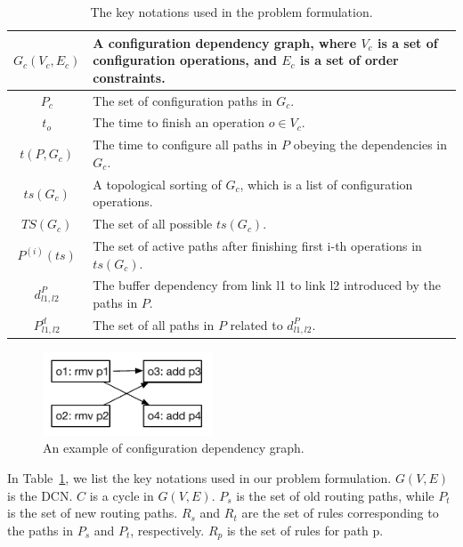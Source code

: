 \begin{table}
\begin{tabularx}{0.48\textwidth}{ |c||X| }
	$G_c(V_c,E_c)$ & A configuration dependency graph, where $V_c$ is a set of configuration operations, and $E_c$ is a set of order constraints.\\
	\hline
	$P_c$ & The set of configuration paths in $G_c$.\\
	\hline
	$t_o$ & The time to finish an operation $ o \in V_c$.\\
	\hline
	$t(P, G_c)$&The time to configure all paths in $P$ obeying the dependencies in $G_c$.\\
	\hline
	$ts(G_c)$ & A topological sorting of $G_c$, which is a list of configuration operations. \\ 
	\hline
	$TS(G_c)$ & The set of all possible $ts(G_c)$. \\
	\hline
	$P^{(i)}(ts)$& The set of active paths after finishing first i-th operations in $ts(G_c)$.\\
	\hline
	$d_{l1,l2}^P$ & The buffer dependency from link l1 to link l2 introduced by the paths in $P$.\\
	\hline
	$P^d_{l1,l2}$ & The set of all paths in $P$ related to  $d_{l1,l2}^P$.\\
	\hline
\end{tabularx}
\caption{The key notations used in the problem formulation.}\label{table:formulation}
\end{table}


\begin{figure}[t]
	\centering
		\includegraphics[width=0.45\textwidth] {figs/formulation_example}
	\caption{An example of configuration dependency graph.}\label{fig:cdgraph}
	
\end{figure}

In Table~\ref{table:formulation}, we list the key notations used in our problem formulation. $G(V,E)$ is the DCN. $C$ is a cycle in $G(V,E)$.  $P_s$ is the set of old routing paths, while $P_t$ is the set of new routing paths. $R_s$ and $R_t$ are the set of rules corresponding to the paths in $P_s$ and $P_t$, respectively.  $R_p$ is the set of rules for path p. 

